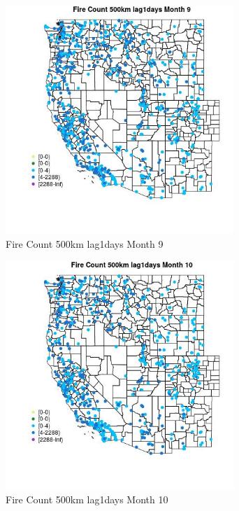 \begin{figure} 
\centering  
\includegraphics[width=0.77\textwidth]{Code_Outputs/Report_ML_input_PM25_Step4_part_e_de_duplicated_aves_compiled_2019-05-21wNAs_MapObsMo9Fire_Count_500km_lag1days.jpg} 
\caption{\label{fig:Report_ML_input_PM25_Step4_part_e_de_duplicated_aves_compiled_2019-05-21wNAsMapObsMo9Fire_Count_500km_lag1days}Fire Count 500km lag1days Month 9} 
\end{figure} 
 

\begin{figure} 
\centering  
\includegraphics[width=0.77\textwidth]{Code_Outputs/Report_ML_input_PM25_Step4_part_e_de_duplicated_aves_compiled_2019-05-21wNAs_MapObsMo10Fire_Count_500km_lag1days.jpg} 
\caption{\label{fig:Report_ML_input_PM25_Step4_part_e_de_duplicated_aves_compiled_2019-05-21wNAsMapObsMo10Fire_Count_500km_lag1days}Fire Count 500km lag1days Month 10} 
\end{figure} 
 


